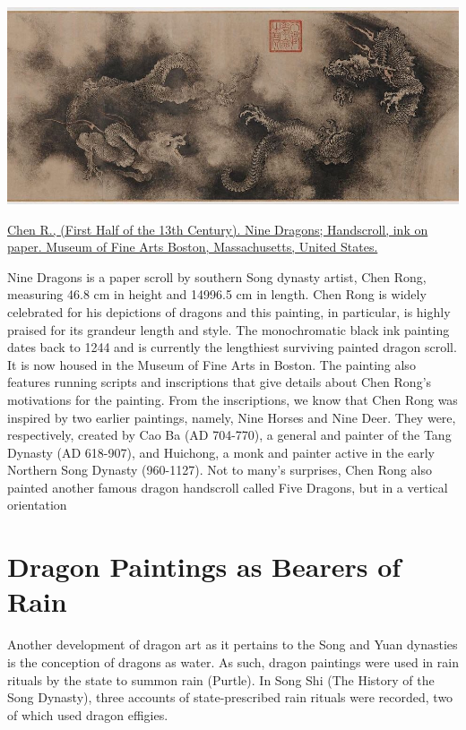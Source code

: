 \documentclass[
]{book}
\begin{document}
\includegraphics[width=1.2\textwidth,height=\textheight]{images/Nine_Dragons.jpg}

\href{https://collections.mfa.org/objects/28526}{Chen R., (First Half of the 13th Century). Nine Dragons; Handscroll, ink on paper. Museum of Fine Arts Boston, Massachusetts, United States.}

Nine Dragons is a paper scroll by southern Song dynasty artist, Chen Rong, measuring 46.8 cm in height and 14996.5 cm in length. Chen Rong is widely celebrated for his depictions of dragons and this painting, in particular, is highly praised for its grandeur length and style. The monochromatic black ink painting dates back to 1244 and is currently the lengthiest surviving painted dragon scroll. It is now housed in the Museum of Fine Arts in Boston.
The painting also features running scripts and inscriptions that give details about Chen Rong's motivations for the painting. From the inscriptions, we know that Chen Rong was inspired by two earlier paintings, namely, Nine Horses and Nine Deer. They were, respectively, created by Cao Ba (AD 704-770), a general and painter of the Tang Dynasty (AD 618-907), and Huichong, a monk and painter active in the early Northern Song Dynasty (960-1127). Not to many's surprises, Chen Rong also painted another famous dragon handscroll called Five Dragons, but in a vertical orientation

\hypertarget{dragon-paintings-as-bearers-of-rain}{%
\section*{Dragon Paintings as Bearers of Rain}\label{dragon-paintings-as-bearers-of-rain}}

Another development of dragon art as it pertains to the Song and Yuan dynasties is the conception of dragons as water. As such, dragon paintings were used in rain rituals by the state to summon rain (Purtle). In Song Shi (The History of the Song Dynasty), three accounts of state-prescribed rain rituals were recorded, two of which used dragon effigies.
\end{document}
